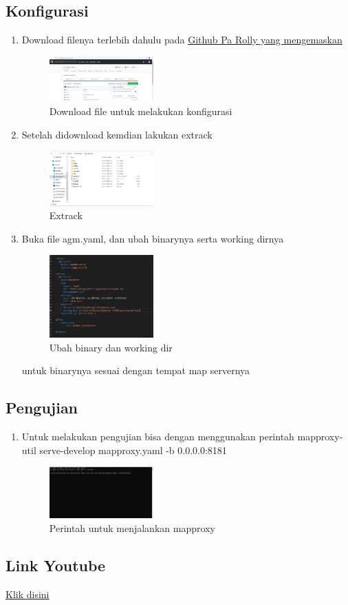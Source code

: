 \subsection{Konfigurasi}
\begin{enumerate}
    \item Download filenya terlebih dahulu pada \href{https://github.com/awangga/gede}{Github Pa Rolly yang mengemaskan}
    \hfill\break
    \begin{figure}[H]
		\includegraphics[width=4cm]{figures/1174009/5/Capture3.png}
		\centering
		\caption{Download file untuk melakukan konfigurasi}
    \end{figure}
    \item Setelah didownload kemdian lakukan extrack
    \hfill\break
    \begin{figure}[H]
		\includegraphics[width=4cm]{figures/1174009/5/Capture4.png}
		\centering
		\caption{Extrack}
    \end{figure}
    \item Buka file agm.yaml, dan ubah binarynya serta working dirnya
    \hfill\break
    \begin{figure}[H]
		\includegraphics[width=4cm]{figures/1174009/5/Capture1.png}
		\centering
		\caption{Ubah binary dan working dir}
    \end{figure}
    untuk binarynya sesuai dengan tempat map servernya
\end{enumerate}
\subsection{Pengujian}
\begin{enumerate}
    \item Untuk melakukan pengujian bisa dengan menggunakan perintah mapproxy-util serve-develop mapproxy.yaml -b 0.0.0.0:8181
    \hfill\break
    \begin{figure}[H]
		\includegraphics[width=4cm]{figures/1174009/5/Capture5.png}
		\centering
		\caption{Perintah untuk menjalankan mapproxy}
    \end{figure}
\end{enumerate}
\subsection{Link Youtube}
\href{https://youtu.be/FNY0D3eaa2w}{Klik disini}